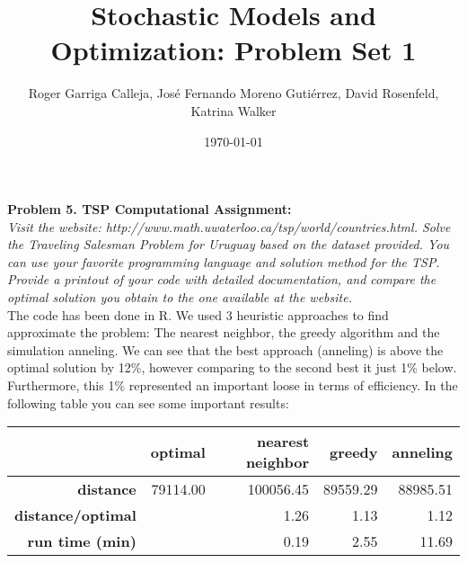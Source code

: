 \documentclass[11pt, english]{article}
\title{Stochastic Models and Optimization: Problem Set 1}
\author{Roger Garriga Calleja, José Fernando Moreno Gutiérrez, David Rosenfeld, Katrina Walker}
\date{\today}
\begin{document}
\maketitle

\textbf{Problem 5. TSP Computational Assignment:}\\\textit{ Visit the website: http://www.math.uwaterloo.ca/tsp/world/countries.html.
Solve the Traveling Salesman Problem for Uruguay based on the dataset provided. You can use your favorite programming language and solution method for the TSP. Provide a printout of your code with detailed documentation, and compare the optimal solution you obtain to the one available at the website.}\\

The code has been done in R. We used 3 heuristic approaches to find approximate the problem: The nearest neighbor, the greedy algorithm and the simulation anneling. We can see that the best approach (anneling) is above the optimal solution by 12\%, however comparing to the second best it just 1\% below. Furthermore, this 1\% represented an important loose in terms of efficiency. In the following table you can see some important results:

\begin{table}[ht]
	\centering
	\begin{tabular}{rrrrr}
		\hline
		& \textbf{optimal} & \textbf{nearest neighbor} & \textbf{greedy} & \textbf{anneling} \\ 
		\hline
		\textbf{distance} & 79114.00 & 100056.45 & 89559.29 & 88985.51 \\ 
		\textbf{distance/optimal} &  & 1.26 & 1.13 & 1.12 \\ 
		\textbf{run time (min)} &  & 0.19 & 2.55 & 11.69 \\ 
		\hline
	\end{tabular}
\end{table}

\lstset{style=myCustomMatlabStyle2}


\end{document}
